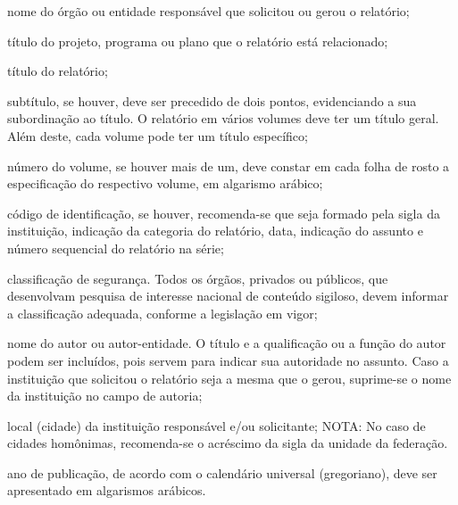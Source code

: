 \documentclass[
12pt,				%
openany,			%
twoside,			%
a4paper,			%
english,			%
french,				%
spanish,			%
brazil,				%
]{abntex2}
\begin{document}
{        \begin{alineas}
        \item nome do órgão ou entidade responsável que solicitou ou gerou o
            relatório; 
        \item título do projeto, programa ou plano que o relatório está relacionado;
        \item título do relatório;
        \item subtítulo, se houver, deve ser precedido de dois pontos, evidenciando a
            sua subordinação ao título. O relatório em vários volumes deve ter um título
            geral. Além deste, cada volume pode ter um título específico; 
        \item número do volume, se houver mais de um, deve constar em cada folha de
            rosto a especificação do respectivo volume, em algarismo arábico; 
        \item código de identificação, se houver, recomenda-se que seja formado
            pela sigla da instituição, indicação da categoria do relatório, data,
            indicação do assunto e número sequencial do relatório na série; 
        \item classificação de segurança. Todos os órgãos, privados ou públicos, que
            desenvolvam pesquisa de interesse nacional de conteúdo sigiloso, devem
            informar a classificação adequada, conforme a legislação em vigor; 
        \item nome do autor ou autor-entidade. O título e a qualificação ou a função
            do autor podem ser incluídos, pois servem para indicar sua autoridade no
            assunto. Caso a instituição que solicitou o relatório seja a mesma que o
            gerou, suprime-se o nome da instituição no campo de autoria; 
        \item local (cidade) da instituição responsável e/ou solicitante; NOTA: No
            caso de cidades homônimas, recomenda-se o acréscimo da sigla da unidade da
            federação.
        \item ano de publicação, de acordo com o calendário universal (gregoriano),
            deve ser apresentado em algarismos arábicos.
        \end{alineas}

        \vspace*{\fill}
    }
\end{document}
